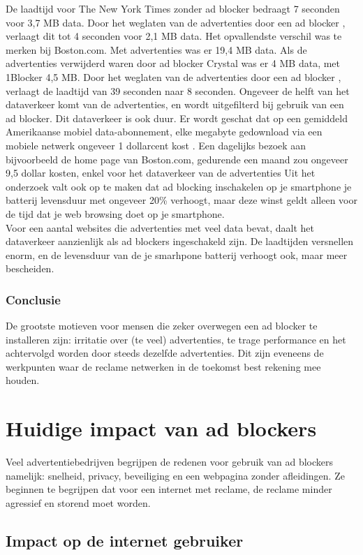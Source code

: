 \documentclass[pdftex,a4paper,12pt,twoside]{report}
\begin{document}
De laadtijd voor The New York Times zonder ad blocker bedraagt 7 seconden voor 3,7 MB data. Door het weglaten van de advertenties door een ad blocker , verlaagt dit tot 4 seconden voor 2,1 MB data. Het opvallendste verschil was te merken bij Boston.com. Met advertenties was er 19,4 MB data. Als de advertenties verwijderd waren door ad blocker Crystal was er 4 MB data, met 1Blocker 4,5 MB. Door het weglaten van de advertenties door een ad blocker , verlaagt de laadtijd van 39 seconden naar 8 seconden.
Ongeveer de helft van het dataverkeer komt van de advertenties, en wordt uitgefilterd bij gebruik van een ad blocker. Dit dataverkeer is ook duur. Er wordt geschat dat op een gemiddeld Amerikaanse mobiel data-abonnement, elke megabyte gedownload via een mobiele netwerk ongeveer 1 dollarcent kost . Een dagelijks bezoek aan bijvoorbeeld de home page van Boston.com, gedurende een maand zou ongeveer 9,5 dollar kosten, enkel voor het dataverkeer van de advertenties 
Uit het onderzoek valt ook op te maken dat ad blocking inschakelen op je smartphone je batterij levensduur met ongeveer 20\% verhoogt, maar deze winst geldt alleen voor de tijd dat je web browsing doet op je smartphone.
\\
Voor een aantal websites die advertenties met veel data bevat, daalt het dataverkeer aanzienlijk als ad blockers ingeschakeld zijn. De laadtijden versnellen enorm, en de levensduur van de je smarhpone batterij verhoogt ook, maar meer bescheiden.

\subsection{Conclusie}
\label{sec Conclusie}
De grootste motieven voor mensen die zeker overwegen een ad blocker te installeren zijn: irritatie over (te veel) advertenties, te trage performance en het achtervolgd worden door steeds dezelfde advertenties. Dit zijn eveneens de werkpunten waar de reclame netwerken in de toekomst best rekening mee houden. 

\chapter{Huidige impact van ad blockers}
\label{ch: Huidige impact van ad blockers}
Veel advertentiebedrijven begrijpen de redenen voor gebruik van ad blockers namelijk: snelheid, privacy, beveiliging en een webpagina zonder afleidingen. Ze beginnen te begrijpen dat voor een internet met reclame, de reclame minder agressief en storend moet worden.
\section{Impact op de internet gebruiker}
\label{sec:Impact op de internet gebruiker}
\end{document}
